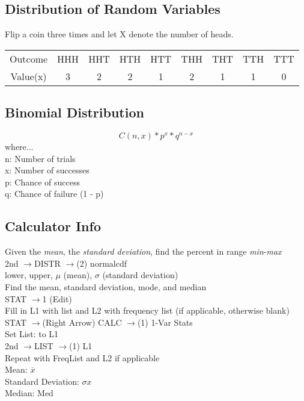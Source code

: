 \documentclass[]{article}
\newcommand*\ra{$\rightarrow$}
\begin{document}
	\subsection*{Distribution of Random Variables}
	Flip a coin three times and let X denote the number of heads.
	\begin{center}
		\begin{tabular}{ |c|c|c|c|c|c|c|c|c| }
			\hline 
				Outcome & HHH & HHT & HTH & HTT & THH & THT & TTH &  TTT \\
				Value(x) & 3 & 2 & 2 & 1 & 2 & 1 & 1 & 0 \\
			\hline
		\end{tabular}
	\end{center}

	\subsection*{Binomial Distribution}
		\begin{equation*}
			C(n, x) * p^x * q^{n - x}
		\end{equation*}
	where... \\
	\indent n: Number of trials \\
	\indent x: Number of successes \\
	\indent p: Chance of success \\
	\indent q: Chance of failure (1 - p) 
	
	\subsection*{Calculator Info}
		Given the \emph{mean}, the \emph{standard deviation}, find the percent in range \emph{min}-\emph{max} \\
	\indent 2nd \ra DISTR \ra (2) normalcdf \\
	\indent lower, upper, $\mu$ (mean), $\sigma$ (standard deviation) \\
	
	\noindent Find the mean, standard deviation, mode, and median \\
	\indent STAT \ra 1 (Edit) \\
	\indent Fill in L1 with list and L2 with frequency list (if applicable, otherwise blank) \\
	\indent STAT \ra (Right Arrow) CALC \ra (1) 1-Var Stats \\
	\indent Set List: to L1 \\
	\indent 2nd \ra LIST \ra (1) L1 \\
	\indent Repeat with FreqList and L2 if applicable \\
	\indent Mean: $\overline{x}$ \\
	\indent Standard Deviation: $\sigma{}x$ \\
	\indent Median: Med
\end{document}
